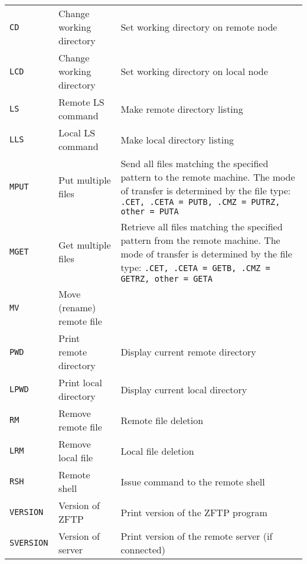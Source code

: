 \begin{longtable}{|>{\tt}p{}|p{}|p{}|}
\tt CD           & Change working directory    &
   Set working directory on remote node                                       \\
\tt LCD          & Change working directory    &
   Set working directory on local  node                                       \\
\tt LS           & Remote LS command           &
   Make remote directory listing                                              \\
\tt LLS          & Local  LS command           &
   Make local  directory listing                                              \\
\tt MPUT         & Put multiple files          &
    Send all files matching the specified pattern to the remote machine.
    The mode of transfer is determined by the file type:
    {\tt.CET, .CETA = PUTB, .CMZ = PUTRZ, other = PUTA}                     \\
\tt MGET         & Get multiple files          &
    Retrieve all files matching the specified pattern from the remote machine.
    The mode of transfer is determined by the file type:
    {\tt.CET, .CETA = GETB, .CMZ = GETRZ, other = GETA}                     \\
\tt MV           & Move (rename) remote file   &                            \\
\tt PWD          & Print remote directory      &
    Display current remote directory                                          \\
\tt LPWD         & Print local  directory      &
    Display current local  directory                                          \\
\tt RM           & Remove remote file          &
    Remote file deletion                                                      \\
\tt LRM          & Remove local  file          &
    Local  file deletion                                                      \\
\tt RSH          & Remote shell                &
    Issue command to the remote shell                                         \\
\tt VERSION      & Version of ZFTP             &
    Print version of the ZFTP program                                         \\
\tt SVERSION     & Version of server           &
Print version of the remote server (if connected)                             \\
\hline
\end{longtable}
